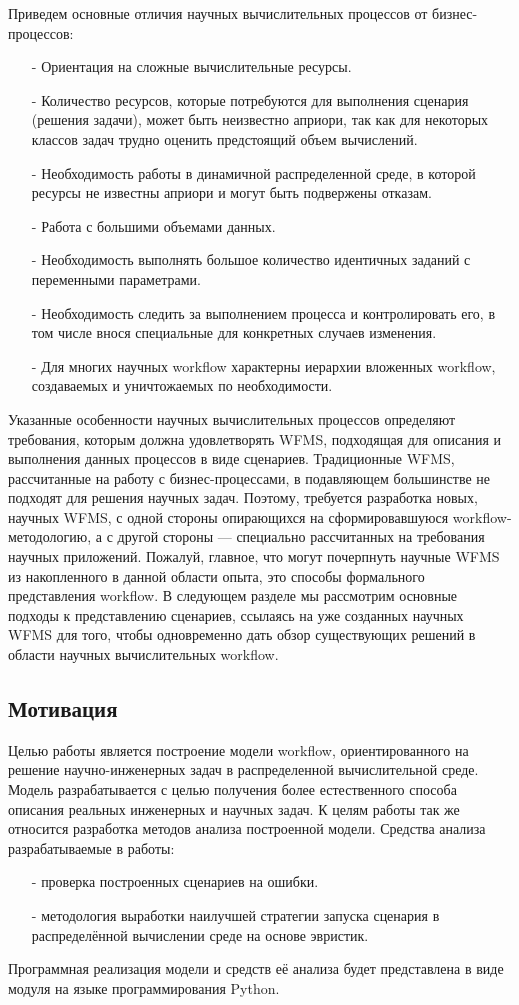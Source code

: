 \documentclass[a4paper,12pt]{article}
\begin{document}
Приведем основные отличия научных вычислительных процессов
от бизнес-процессов:
\begin{enumerate}
\item[-] Ориентация на сложные вычислительные ресурсы.
\item[-] Количество ресурсов, которые потребуются для выполнения сценария (решения задачи), может быть неизвестно априори, так как
для некоторых классов задач трудно оценить предстоящий объем
вычислений.
\item[-] Необходимость работы в динамичной распределенной среде, в которой ресурсы не известны априори и могут быть подвержены отказам.
\item[-] Работа с большими объемами данных.
\item[-] Необходимость выполнять большое количество идентичных заданий
с переменными параметрами.
\item[-] Необходимость следить за выполнением процесса и контролировать
его, в том числе внося специальные для конкретных случаев изменения.
\item[-]  Для многих научных workflow характерны иерархии вложенных workflow, создаваемых и уничтожаемых по необходимости.
\end{enumerate}

Указанные особенности научных вычислительных процессов определяют требования, которым должна удовлетворять WFMS, подходящая для
описания и выполнения данных процессов в виде сценариев. Традиционные WFMS, рассчитанные на работу с бизнес-процессами, в подавляющем большинстве не подходят для решения научных задач. Поэтому, требуется разработка новых, научных WFMS, с одной стороны опирающихся на сформировавшуюся workflow-методологию, а с другой стороны — специально рассчитанных на требования научных приложений.
Пожалуй, главное, что могут почерпнуть научные WFMS из накопленного в данной области опыта, это способы формального представления workflow. В следующем разделе мы рассмотрим основные подходы
к представлению сценариев, ссылаясь на уже созданных научных WFMS для того, чтобы одновременно дать обзор существующих
решений в области научных вычислительных workflow.


\subsection*{Мотивация}
Целью работы является построение модели workflow, ориентированного  на решение научно-инженерных задач в распределенной вычислительной среде.
Модель разрабатывается с целью получения более естественного способа
описания реальных инженерных и научных задач. 
К целям работы так же относится разработка методов анализа построенной модели.
Средства анализа разрабатываемые в работы:
\begin{enumerate}
\item[-] проверка построенных сценариев на ошибки.
\item[-] методология выработки наилучшей стратегии запуска сценария в распределённой вычислении среде на основе эвристик.
\end{enumerate}
Программная реализация модели и средств её анализа будет представлена в виде модуля на языке программирования Python.
\end{document}
